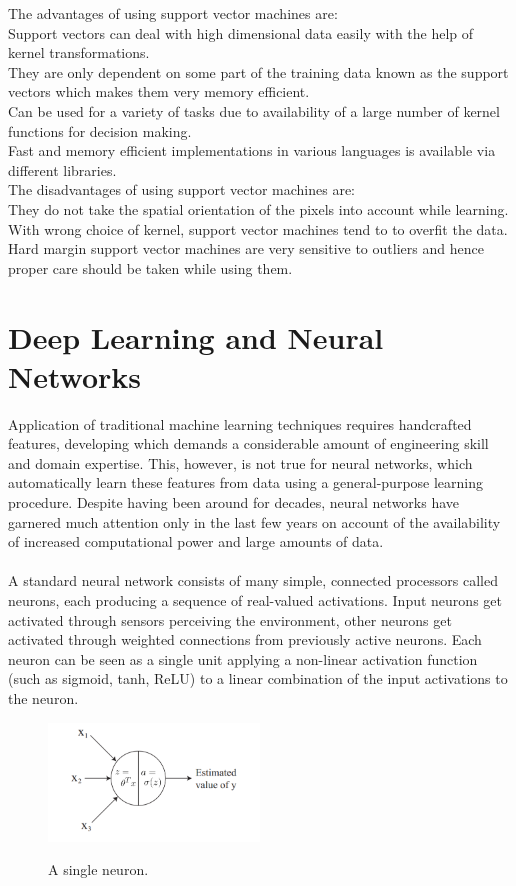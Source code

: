 \documentclass[12pt, a4paper]{report}
\begin{document}
The advantages of using support vector machines are:\\
Support vectors can deal with high dimensional data easily with the help of kernel transformations.\\
They are only dependent on some part of the training data known as the support vectors which makes them very memory efficient.\\
Can be used for a variety of tasks due to availability of a large number of kernel functions for decision making.\\
Fast and memory efficient implementations in various languages is available via different libraries.\\

The disadvantages of using support vector machines are:\\
They do not take the spatial orientation of the pixels into account while learning.\\
With wrong choice of kernel, support vector machines tend to to overfit the data.\\
Hard margin support vector machines are very sensitive to outliers and hence proper care should be taken while using them.\\


\section{Deep Learning and Neural Networks}
Application of traditional machine learning techniques requires handcrafted features, developing which demands a considerable amount of engineering skill and domain expertise. This, however, is not true for neural networks, which automatically learn these features from data using a general-purpose learning procedure.\cite{eyesky, cs231n} Despite having been around for decades, neural networks have garnered much attention only in the last few years on account of the availability of increased computational power and large amounts of data.
\paragraph{}
A standard neural network consists of many simple, connected processors called neurons, each producing a sequence of real-valued activations. Input neurons get activated through sensors perceiving the environment, other neurons get activated through weighted connections from previously active neurons. \cite{schmidhuber2015deep} Each neuron can be seen as a single unit applying a non-linear activation function (such as sigmoid, tanh, ReLU) to a linear combination of the input activations to the neuron.\cite{cs229}
\begin{figure}[h]
\centering
\includegraphics[width=0.5\textwidth]{nn1.png}
\caption{A single neuron.}\cite{cs229}
\end{figure}
\end{document}
